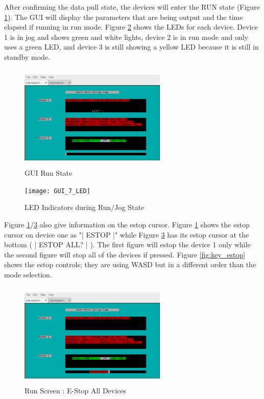 \documentclass[journal]{IEEEtran}
\begin{document}
            After confirming the data pull state, the devices will enter the RUN state (Figure \ref{fig:GUI7}). The GUI will display the parameters that are being output and the time elapsed if running in run mode. Figure \ref{fig:GUI7_L} shows the LEDs for each device. Device 1 is in jog and shows green and white lights, device 2 is in run mode and only uses a green LED, and device 3 is still showing a yellow LED because it is still in standby mode. 
            
            \begin{figure}[H]
                \centering
                \includegraphics[width=7cm, height=5cm]{GUI_7}
                \caption{GUI Run State}
                \label{fig:GUI7}
            \end{figure}
            
            \begin{figure}[H]
                \centering
                \texttt{[image: GUI\_7\_LED]}
                \caption{LED Indicators during Run/Jog State}
                \label{fig:GUI7_L}
            \end{figure}
            
            Figure \ref{fig:GUI7}/\ref{fig:GUI9} also give information on the estop cursor. Figure \ref{fig:GUI7} shows the estop cursor on device one as "| ESTOP |" while Figure \ref{fig:GUI9} has its estop cursor at the bottom ( | ESTOP ALL? | ). The first figure will estop the device 1 only while the second figure will stop all of the devices if pressed. Figure \ref{fig:key_estop} shows the estop controls; they are using WASD but in a different order than the mode selection.   
            
            \begin{figure}[H]
                \centering
                \includegraphics[width=7cm, height=5cm]{GUI_9}
                \caption{Run Screen : E-Stop All Devices}
                \label{fig:GUI9}
            \end{figure}
            
\end{document}
